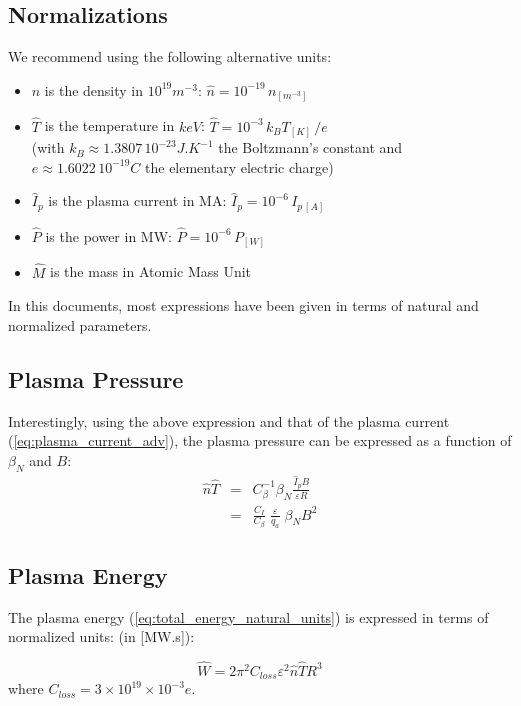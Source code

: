 \subsection{Normalizations}
We recommend using the following alternative units: 
\begin{itemize}
    \item $\hat n$ is the density in $10^{19} \si{m^{-3}}$: 
    $\hat n = 10^{-19}\,n_{\si{[m^{-3}]}}$
    \item $\hat T$ is the temperature in $keV$: $\hat T = 10^{-3}\, k_B T_{[K]}\,/e$ \\(with $k_B \approx 1.3807\, 10^{-23} \si{J.K^{-1}}$ the Boltzmann's constant and $e\approx 1.6022\, 10^{-19}C$ the elementary electric charge)
    \item $\hat I_p$ is the plasma current in MA: $\hat I_p = 10^{-6}\,I_{p\,[A]}$
    \item $\hat P$ is the power in MW: $\hat P = 10^{-6}\, P_{[W]}$
    \item $\hat M$ is the mass in Atomic Mass Unit
\end{itemize}

In this documents, most expressions have been given in terms of natural and normalized parameters. 



\subsection{Plasma Pressure}
Interestingly, using the above expression and that of the plasma current (\ref{eq:plasma_current_adv}), the plasma pressure can be expressed as a function of $\beta_N$ and $B$:
\begin{eqnarray}
\hat n\hat T &=& C_\beta^{-1} \beta_N \frac{\hat I_p B}{\varepsilon R} \nonumber \\
&=& \frac{C_I}{C_\beta}\; \frac{\varepsilon}{q_a} \;  \beta_N B^2
\label{eqn:nT_betaN_adv}
\end{eqnarray}

\subsection{Plasma Energy}
The plasma energy (\ref{eq:total_energy_natural_units}) is expressed in terms of normalized units: (in [MW.s]):

\begin{equation}
\hat W = 2\pi^2 C_{loss}  \varepsilon^2  \hat n \hat T R^3
\label{eq:total_energy}
\end{equation}
where $C_{loss} = 3 \times 10^{19} \times 10^{-3} e$.



